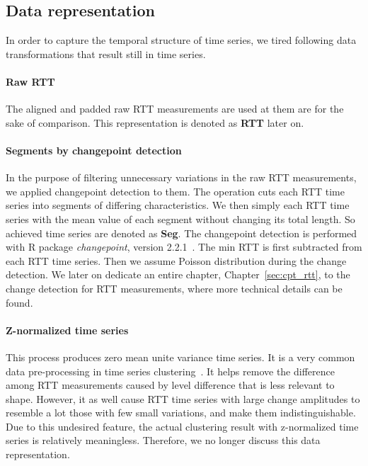 \subsection{Data representation}
In order to capture the temporal structure of time series, we tired following data transformations that result still in time series.

\paragraph*{Raw RTT}  The aligned and padded raw RTT measurements are used at them are for the sake of comparison. This representation is denoted as \textbf{RTT} later on.

\paragraph*{Segments by changepoint detection} In the purpose of filtering unnecessary variations in the raw RTT measurements, we applied changepoint detection to them. The operation cuts each RTT time series into segments of differing characteristics. We then simply each RTT time series with the mean value of each segment without changing its total length. So achieved time series are denoted as \textbf{Seg}. The changepoint detection is performed with R package \textit{changepoint}, version 2.2.1~\cite{Killick2013a}. The min RTT is first subtracted from each RTT time series. Then we assume Poisson distribution during the change detection. We later on dedicate an entire chapter, Chapter~\ref{sec:cpt_rtt}, to the change detection for RTT measurements, where more technical details can be found.

\paragraph*{Z-normalized time series} This process produces zero mean unite variance time series. It is a very common data pre-processing in time series clustering~\cite{Ulanova2015,Ratanamahatana2004}. It helps remove the difference among RTT measurements caused by level difference that is less relevant to shape. However, it as well cause RTT time series with large change amplitudes to resemble a lot those with few small variations, and make them indistinguishable. Due to this undesired feature, the actual clustering result with z-normalized time series is relatively meaningless. Therefore, we no longer discuss this data representation.

